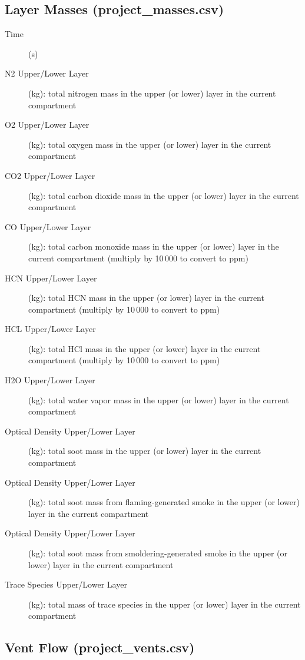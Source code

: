 \subsection{Layer Masses (project\_masses.csv)}

\begin{description}
\item[Time] (s)
\item[N2 Upper/Lower Layer] (kg): total nitrogen mass in the upper (or lower) layer in the current compartment
\item[O2 Upper/Lower Layer] (kg): total oxygen mass in the upper (or lower) layer in the current compartment
\item[CO2 Upper/Lower Layer] (kg):  total carbon dioxide mass in the upper (or lower) layer in the current compartment
\item[CO Upper/Lower Layer] (kg):  total carbon monoxide mass in the upper (or lower) layer in the current compartment (multiply by 10\,000 to convert to ppm)
\item[HCN Upper/Lower Layer] (kg):  total HCN mass in the upper (or lower) layer in the current compartment (multiply by 10\,000 to convert to ppm)
\item[HCL Upper/Lower Layer] (kg):  total HCl mass in the upper (or lower) layer in the current compartment (multiply by 10\,000 to convert to ppm)
\item[H2O Upper/Lower Layer] (kg):  total water vapor mass in the upper (or lower) layer in the current compartment
\item[Optical Density Upper/Lower Layer] (kg):  total soot mass in the upper (or lower) layer in the current compartment
\item[Optical Density Upper/Lower Layer] (kg):  total soot mass from flaming-generated smoke in the upper (or lower) layer in the current compartment
\item[Optical Density Upper/Lower Layer] (kg):  total soot mass from smoldering-generated smoke in the upper (or lower) layer in the current compartment
\item[Trace Species Upper/Lower Layer] (kg):  total mass of trace species in the upper (or lower) layer in the current compartment
\end{description}

\subsection{Vent Flow (project\_vents.csv)}

